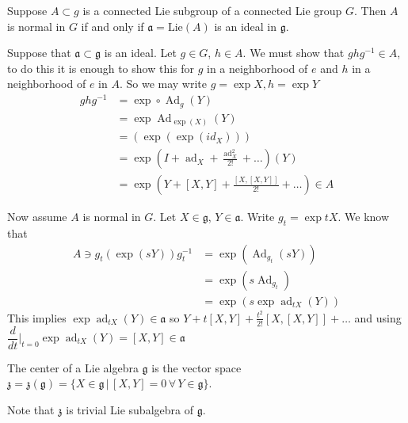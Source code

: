 \documentclass[11pt,a4paper]{scrarticle}
\theoremstyle{definition}
\renewenvironment{proof}[1][\proofname]{\vspace{-15pt}\begin{myproof}}{\end{myproof}}
\theoremstyle{greenbox}
\newcommand{\ag}{\mathfrak{a}}
\newcommand{\fg}{\mathfrak{g}}
\begin{document}
\begin{thm}
    Suppose $ A \subset g$ is a connected Lie subgroup of a connected Lie group $ G $. Then $ A $ is normal in $ G $ if and only if $ \ag = \text{Lie}(A) $ is an ideal in $ \fg $.
\end{thm}
\begin{proof}
    Suppose that $ \ag  \subset \fg $ is an ideal. Let $ g \in G $, $ h \in A $. We must show that $ ghg^{-1} \in A $, to do this it is enough to show this for $ g $ in a neighborhood of $ e $ and $ h $ in a neighborhood of $ e $ in $ A $. So we may write $ g = \exp X, h = \exp Y $  \begin{align*}
        ghg^{-1} & = \exp \circ \operatorname{Ad}_{g}(Y) \\
        & = \exp \operatorname{Ad}_{\exp(X)}(Y) \\
        & = \left( \exp \left( \exp(id_{X}) \right) \right) \\
        & = \exp \left( I + \operatorname{ad}_{X} + \frac{\operatorname{ad}_{X}^{2}}{2!} + \ldots \right)(Y) \\
        & = \exp\left(Y+ [X,Y]+ \frac{[X,[X,Y]]}{2!}+ \ldots \right) \in A
    \end{align*}

Now assume $ A $ is normal in $ G $. Let $ X \in \fg $, $ Y \in \ag $. Write $ g_{t} = \exp tX $. We know that \begin{align*}
   A \ni g_{t} ( \exp(sY))g_{t}^{-1} & = \exp( \operatorname{Ad}_{g_{t}}(sY)) \\
   & = \exp(s \operatorname{Ad}_{g_{t}}) \\
   & = \exp(s \exp \operatorname{ad}_{tX}(Y))
\end{align*}
This implies $ \exp \operatorname{ad}_{tX}(Y) \in \ag $ so $ Y+ t[X,Y] + \frac{t^{2}}{2!}[X,[X,Y]] + \dots $ and using $ \dfrac{d}{dt}\bigg|_{t=0} \exp \operatorname{ad}_{tX}(Y) = [X,Y] \in \ag $
\end{proof}

\begin{defn}
    The center of a Lie algebra $\fg $ is the vector space $ \mathfrak{z} = \mathfrak{z}(\fg) = \{X \in \fg \,  | \, [X,Y] = 0 \, \forall \, Y \in \fg\} $.
\end{defn}
\begin{remark}
    Note that $ \mathfrak{z} $ is trivial Lie subalgebra of $ \fg $.
\end{remark}
\end{document}
